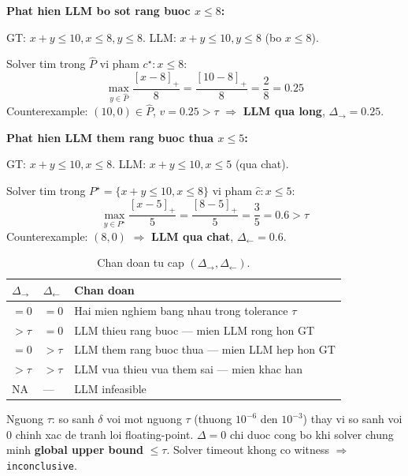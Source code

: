 \documentclass[11pt,a4paper]{article}
\begin{document}
\begin{example}
\textbf{Phat hien LLM bo sot rang buoc $x \leq 8$:}

GT: $x+y\leq10, x\leq8, y\leq8$. LLM: $x+y\leq10, y\leq8$ (bo $x\leq8$).

Solver tim trong $\widehat{P}$ vi pham $c^\star: x\leq8$:
\[
\max_{y\in\widehat{P}} \frac{[x-8]_+}{8} = \frac{[10-8]_+}{8} = \frac{2}{8} = 0.25
\]
Counterexample: $(10,0) \in \widehat{P}$, $v=0.25>\tau$
$\Rightarrow$ \textbf{LLM qua long}, $\Delta_{\to}=0.25$.
\end{example}

\begin{example}
\textbf{Phat hien LLM them rang buoc thua $x \leq 5$:}

GT: $x+y\leq10, x\leq8$. LLM: $x+y\leq10, x\leq5$ (qua chat).

Solver tim trong $P^\star = \{x+y\leq10,x\leq8\}$ vi pham $\hat{c}: x\leq5$:
\[
\max_{y\in P^\star} \frac{[x-5]_+}{5} = \frac{[8-5]_+}{5} = \frac{3}{5} = 0.6>\tau
\]
Counterexample: $(8,0)$ $\Rightarrow$ \textbf{LLM qua chat}, $\Delta_{\leftarrow}=0.6$.
\end{example}

\begin{table}[htbp]
\centering
\caption{Chan doan tu cap $(\Delta_{\to}, \Delta_{\leftarrow})$.}
\small
\begin{tabularx}{\textwidth}{C{2.2cm} C{2.5cm} Y}
\toprule
$\Delta_{\to}$ & $\Delta_{\leftarrow}$ & Chan doan \\
\midrule
$=0$ & $=0$ & Hai mien nghiem bang nhau trong tolerance $\tau$ \\
$>\tau$ & $=0$ & LLM thieu rang buoc --- mien LLM rong hon GT \\
$=0$ & $>\tau$ & LLM them rang buoc thua --- mien LLM hep hon GT \\
$>\tau$ & $>\tau$ & LLM vua thieu vua them sai --- mien khac han \\
NA & --- & LLM infeasible \\
\bottomrule
\end{tabularx}
\end{table}

\begin{warningbox}
Nguong $\tau$: so sanh $\delta$ voi mot nguong $\tau$ (thuong $10^{-6}$ den $10^{-3}$)
thay vi so sanh voi 0 chinh xac de tranh loi floating-point.
$\Delta=0$ chi duoc cong bo khi solver chung minh \textbf{global upper bound} $\leq\tau$.
Solver timeout khong co witness $\Rightarrow$ \texttt{inconclusive}.
\end{warningbox}
\end{document}
